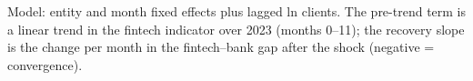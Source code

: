 \begin{table}[!htbp]\centering
\small
\caption{Pre-trend and post-shock recovery slope of the fintech--bank gap}
\label{tab:dyn}
\par\vspace{2pt}\parbox{\textwidth}{\footnotesize Model: entity and month fixed effects plus lagged ln clients. The pre-trend term is a linear trend in the fintech indicator over 2023 (months 0--11); the recovery slope is the change per month in the fintech--bank gap after the shock (negative = convergence).}
\end{table}